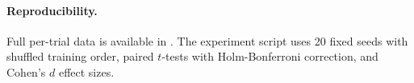 \paragraph{Reproducibility.}
Full per-trial data is available in
.
The experiment script uses 20 fixed seeds with shuffled training order,
paired $t$-tests with Holm-Bonferroni correction, and Cohen's $d$ effect sizes.



